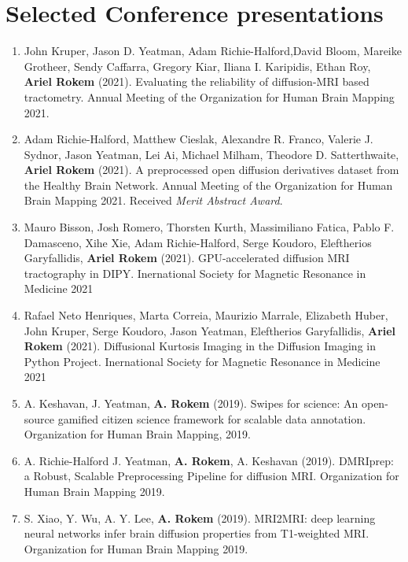 \documentclass[11pt,fullpage]{article}
\begin{document}
\section*{Selected Conference presentations}
\begin{enumerate}

\item John Kruper, Jason D. Yeatman, Adam Richie-Halford,David Bloom, Mareike Grotheer, Sendy Caffarra, Gregory Kiar, Iliana I. Karipidis, Ethan Roy, {\bf Ariel Rokem} (2021). Evaluating the reliability of diffusion-MRI based tractometry. Annual Meeting of the Organization for Human Brain Mapping 2021.

\item Adam Richie-Halford, Matthew Cieslak, Alexandre R. Franco, Valerie J. Sydnor, Jason Yeatman, Lei Ai, Michael Milham, Theodore D. Satterthwaite, {\bf Ariel Rokem} (2021). A preprocessed open diffusion derivatives dataset from the Healthy Brain Network. Annual Meeting of the Organization for Human Brain Mapping 2021. Received \emph{Merit Abstract Award}.

\item Mauro Bisson, Josh Romero, Thorsten Kurth, Massimiliano Fatica, Pablo F. Damasceno, Xihe Xie, Adam Richie-Halford, Serge Koudoro, Eleftherios Garyfallidis, {\bf Ariel Rokem} (2021). GPU-accelerated diffusion MRI tractography in DIPY. Inernational Society for Magnetic Resonance in Medicine 2021

\item Rafael Neto Henriques, Marta Correia, Maurizio Marrale, Elizabeth Huber, John Kruper, Serge Koudoro, Jason Yeatman, Eleftherios Garyfallidis, {\bf Ariel Rokem} (2021). Diffusional Kurtosis Imaging in the Diffusion Imaging in Python Project. Inernational Society for Magnetic Resonance in Medicine 2021

\item A. Keshavan, J. Yeatman, {\bf A. Rokem} (2019). Swipes for science: An
open-source gamified citizen science framework for scalable data annotation.
Organization for Human Brain Mapping, 2019.

\item A. Richie-Halford J. Yeatman, {\bf A. Rokem}, A. Keshavan (2019).
DMRIprep: a Robust, Scalable Preprocessing Pipeline for diffusion MRI.
Organization for Human Brain Mapping 2019.

\item S. Xiao, Y. Wu, A. Y. Lee, {\bf A. Rokem} (2019). MRI2MRI: deep learning
neural networks infer brain diffusion properties from T1-weighted MRI. Organization for Human Brain Mapping 2019.


\end{enumerate}
\end{document}
